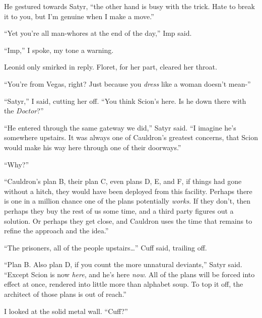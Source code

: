 He gestured towards Satyr, ``\ldotsand the other hand is busy with the trick.  Hate to break it to you, but I'm genuine when I make a move.''



``Yet you're all man-whores at the end of the day,'' Imp said.



``Imp,'' I spoke, my tone a warning.



Leonid only smirked in reply.  Floret, for her part, cleared her throat.



``You're from Vegas, right?  Just because you \emph{dress} like a woman doesn't mean-''



``Satyr,'' I said, cutting her off.  ``You think Scion's here.  Is he down there with the \emph{Doctor}?''



``He entered through the same gateway we did,'' Satyr said.  ``I imagine he's somewhere upstairs.  It was always one of Cauldron's greatest concerns, that Scion would make his way here through one of their doorways.''



``Why?''



``Cauldron's plan B, their plan C, even plans D, E, and F, if things had gone without a hitch, they would have been deployed from this facility.  Perhaps there is one in a million chance one of the plans potentially \emph{works}.  If they don't, then perhaps they buy the rest of us some time, and a third party figures out a solution.  Or perhaps they get close, and Cauldron uses the time that remains to refine the approach and the idea.''



``The prisoners, all of the people upstairs\ldots'' Cuff said, trailing off.



``Plan B.  Also plan D, if you count the more unnatural deviants,'' Satyr said.  ``Except Scion is now \emph{here}, and he's here \emph{now}.  All of the plans will be forced into effect at once, rendered into little more than alphabet soup.  To top it off, the architect of those plans is out of reach.''



I looked at the solid metal wall.  ``Cuff?''



